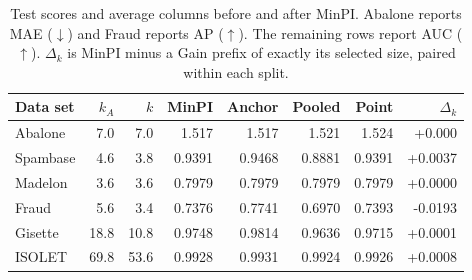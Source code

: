 \begin{table}[tb]
\centering
\caption{Test scores and average columns before and after MinPI. Abalone reports MAE ($\downarrow$) and Fraud reports AP ($\uparrow$). The remaining rows report AUC ($\uparrow$). $\Delta_k$ is MinPI minus a Gain prefix of exactly its selected size, paired within each split.}
\label{tab:datasets}
\small
\begin{tabular}{@{}lrrrrrrr@{}}
\toprule
Data set & $k_A$ & $k$ & MinPI & Anchor & Pooled & Point & $\Delta_k$ \\
\midrule
Abalone & 7.0 & 7.0 & 1.517 & 1.517 & 1.521 & 1.524 & +0.000 \\
Spambase & 4.6 & 3.8 & 0.9391 & 0.9468 & 0.8881 & 0.9391 & +0.0037 \\
Madelon & 3.6 & 3.6 & 0.7979 & 0.7979 & 0.7979 & 0.7979 & +0.0000 \\
Fraud & 5.6 & 3.4 & 0.7376 & 0.7741 & 0.6970 & 0.7393 & -0.0193 \\
Gisette & 18.8 & 10.8 & 0.9748 & 0.9814 & 0.9636 & 0.9715 & +0.0001 \\
ISOLET & 69.8 & 53.6 & 0.9928 & 0.9931 & 0.9924 & 0.9926 & +0.0008 \\
\bottomrule
\end{tabular}
\end{table}
